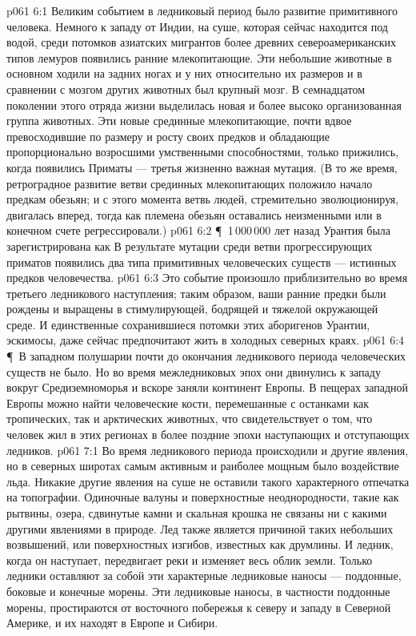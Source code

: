 \vs p061 6:1 Великим событием в ледниковый период было развитие примитивного человека. Немного к западу от Индии, на суше, которая сейчас находится под водой, среди потомков азиатских мигрантов более древних североамериканских типов лемуров  появились ранние млекопитающие. Эти небольшие животные в основном ходили на задних ногах и у них относительно их размеров и в сравнении с мозгом других животных был крупный мозг. В семнадцатом поколении этого отряда жизни  выделилась новая и более высоко организованная группа животных. Эти новые срединные млекопитающие, почти вдвое превосходившие по размеру и росту своих предков и обладающие пропорционально возросшими умственными способностями, только прижились, когда  появились Приматы --- третья жизненно важная мутация. (В то же время, ретроградное развитие ветви срединных млекопитающих положило начало предкам обезьян; и с этого момента ветвь людей, стремительно эволюционируя, двигалась вперед, тогда как племена обезьян оставались неизменными или в конечном счете регрессировали.)
\vs p061 6:2 \P\ 1\,000\,000 лет назад Урантия была зарегистрирована как  В результате мутации среди ветви прогрессирующих приматов  появились два типа примитивных человеческих существ --- истинных предков человечества.
\vs p061 6:3 Это событие произошло приблизительно во время третьего ледникового наступления; таким образом, ваши ранние предки были рождены и выращены в стимулирующей, бодрящей и тяжелой окружающей среде. И единственные сохранившиеся потомки этих аборигенов Урантии, эскимосы, даже сейчас предпочитают жить в холодных северных краях.
\vs p061 6:4 \P\ В западном полушарии почти до окончания ледникового периода человеческих существ не было. Но во время межледниковых эпох они двинулись к западу вокруг Средиземноморья и вскоре заняли континент Европы. В пещерах западной Европы можно найти человеческие кости, перемешанные с останками как тропических, так и арктических животных, что свидетельствует о том, что человек жил в этих регионах в более поздние эпохи наступающих и отступающих ледников.
\vs p061 7:1 Во время ледникового периода происходили и другие явления, но в северных широтах самым активным и раиболее мощным было воздействие льда. Никакие другие явления на суше не оставили такого характерного отпечатка на топографии. Одиночные валуны и поверхностные неоднородности, такие как рытвины, озера, сдвинутые камни и скальная крошка не связаны ни с какими другими явлениями в природе. Лед также является причиной таких небольших возвышений, или поверхностных изгибов, известных как друмлины. И ледник, когда он наступает, передвигает реки и изменяет весь облик земли. Только ледники оставляют за собой эти характерные ледниковые наносы --- поддонные, боковые и конечные морены. Эти ледниковые наносы, в частности поддонные морены, простираются от восточного побережья к северу и западу в Северной Америке, и их находят в Европе и Сибири.

